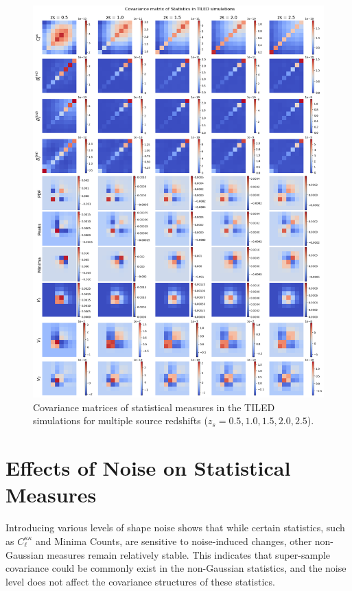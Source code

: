 \begin{figure}[p]
    \centering
    \includegraphics[width=\textwidth]{figures/results/cov_tiled.png}
    \caption[Covariance Matrices of Statistical Measures in TILED Simulations]{Covariance matrices of statistical measures in the TILED simulations for multiple source redshifts ($z_s = 0.5, 1.0, 1.5, 2.0, 2.5$).}
    \label{fig:cov_tiled}
\end{figure}

\section{Effects of Noise on Statistical Measures}
Introducing various levels of shape noise shows that while certain statistics, such as $C_\ell^{\kappa\kappa}$ and Minima Counts, are sensitive to noise-induced changes, other non-Gaussian measures remain relatively stable. This indicates that super-sample covariance could be commonly exist in the non-Gaussian statistics, and the noise level does not affect the covariance structures of these statistics.


